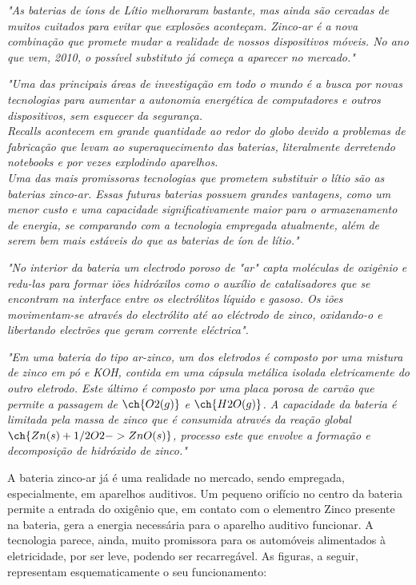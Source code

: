 \documentclass[12pt,a4paper]{article}
\begin{document}
\textit{"As baterias de íons de Lítio melhoraram bastante, mas ainda são cercadas de muitos cuitados para evitar que explosões aconteçam. Zinco-ar é a nova combinação que promete mudar a realidade de nossos dispositivos móveis. No ano que vem, 2010, o possível substituto já começa a aparecer no mercado."}\\ \dotfill

\textit{"Uma das principais áreas de investigação em todo o mundo é a busca por novas tecnologias para aumentar a autonomia energética de computadores e outros dispositivos, sem esquecer da segurança.\\ Recalls acontecem em grande quantidade ao redor do globo devido a problemas de fabricação que levam ao superaquecimento das baterias, literalmente derretendo notebooks e por vezes explodindo aparelhos.\\ Uma das mais promissoras tecnologias que prometem substituir o lítio são as baterias zinco-ar. Essas futuras baterias possuem grandes vantagens, como um menor custo e uma capacidade significativamente maior para o armazenamento de energia, se comparando com a tecnologia empregada atualmente, além de serem bem mais estáveis do que as baterias de íon de lítio."}\\ \dotfill

\textit{"No interior da bateria um electrodo poroso de "ar" capta moléculas de oxigênio e redu-las para formar iões hidróxilos como o auxílio de catalisadores que se encontram na interface entre os electrólitos líquido e gasoso. Os iões movimentam-se através do electrólito até ao eléctrodo de zinco, oxidando-o e libertando electrões que geram corrente eléctrica".}\\ \dotfill

\textit{"Em uma bateria do tipo ar-zinco, um dos eletrodos é composto por uma mistura de zinco em pó e KOH, contida em uma cápsula metálica isolada eletricamente do outro eletrodo. Este último é composto por uma placa porosa de carvão que permite a passagem de $\ch{O2 (g)}$ e $\ch{H2O (g)}$. A capacidade da bateria é limitada pela massa de zinco que é consumida através da reação global $\ch{Zn (s) + 1/2 O2 -> ZnO (s)}$, processo este que envolve a formação e decomposição de hidróxido de zinco." }\\ \dotfill


A bateria zinco-ar já é uma realidade no mercado, sendo empregada, especialmente, em aparelhos auditivos. Um pequeno orifício no centro da bateria permite a entrada do oxigênio que, em contato com o elementro Zinco presente na bateria, gera a energia necessária para o aparelho auditivo funcionar. A tecnologia parece, ainda, muito promissora para os automóveis alimentados à eletricidade, por ser leve, podendo ser recarregável. As figuras, a seguir, representam esquematicamente o seu funcionamento:
\end{document}
